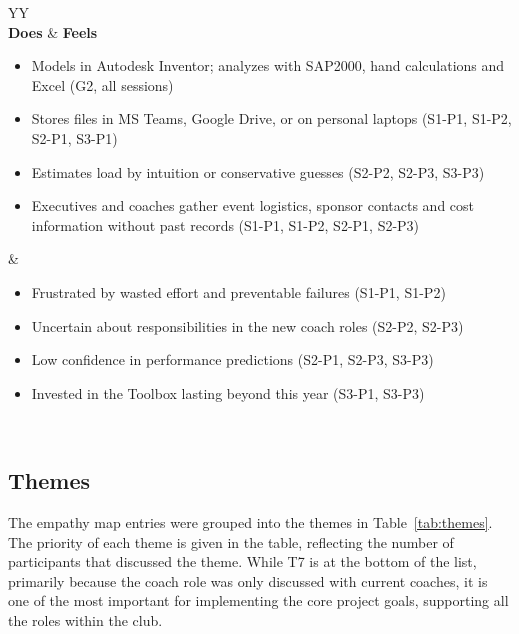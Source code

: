 \documentclass{article}
\begin{document}
\begin{table}[H]
\begin{tabularx}{\textwidth}{YY}
\\
\midrule
\textbf{Does} & \textbf{Feels} \\
\midrule
\begin{itemize}[leftmargin=*, nosep, before=\vspace{-0.6\baselineskip}]
  \item Models in Autodesk Inventor; analyzes with SAP2000, hand calculations
        and Excel (G2, all sessions)
  \item Stores files in MS Teams, Google Drive, or on personal laptops
        (S1-P1, S1-P2, S2-P1, S3-P1)
  \item Estimates load by intuition or conservative guesses
        (S2-P2, S2-P3, S3-P3)
  \item Executives and coaches gather event logistics, sponsor contacts and
        cost information without past records (S1-P1, S1-P2, S2-P1, S2-P3)
\end{itemize}
&
\begin{itemize}[leftmargin=*, nosep, before=\vspace{-0.6\baselineskip}]
  \item Frustrated by wasted effort and preventable failures (S1-P1, S1-P2)
  \item Uncertain about responsibilities in the new coach roles
        (S2-P2, S2-P3)
  \item Low confidence in performance predictions (S2-P1, S2-P3, S3-P3)
  \item Invested in the Toolbox lasting beyond this year (S3-P1, S3-P3)
\end{itemize}
\\
\bottomrule
\end{tabularx}
\end{table}

\subsection{Themes}
\label{sec:themes}

The empathy map entries were grouped into the themes in Table~\ref{tab:themes}. The priority of each theme is given in the table, 
reflecting the number of participants that discussed the theme. While T7 is at the bottom of the list, primarily because the coach role 
was only discussed with current coaches, it is one of the most important for implementing the core project goals, supporting all the 
roles within the club. 
\end{document}
